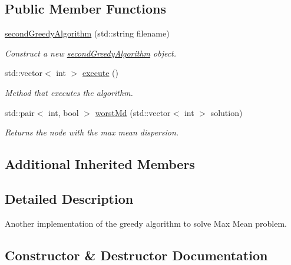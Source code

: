 \subsection*{Public Member Functions}
\begin{DoxyCompactItemize}
\item 
\hyperlink{classsecondGreedyAlgorithm_a0514ddce71b6343aaf54833c687a0fdf}{second\+Greedy\+Algorithm} (std\+::string filename)
\begin{DoxyCompactList}\small\item\em Construct a new \hyperlink{classsecondGreedyAlgorithm}{second\+Greedy\+Algorithm} object. \end{DoxyCompactList}\item 
std\+::vector$<$ int $>$ \hyperlink{classsecondGreedyAlgorithm_a119a730116003d00438179ccf4e2cafd}{execute} ()
\begin{DoxyCompactList}\small\item\em Method that executes the algorithm. \end{DoxyCompactList}\item 
std\+::pair$<$ int, bool $>$ \hyperlink{classsecondGreedyAlgorithm_a714fa858b1666fc77153890ac16f1b3f}{worst\+Md} (std\+::vector$<$ int $>$ solution)
\begin{DoxyCompactList}\small\item\em Returns the node with the max mean dispersion. \end{DoxyCompactList}\end{DoxyCompactItemize}
\subsection*{Additional Inherited Members}


\subsection{Detailed Description}
Another implementation of the greedy algorithm to solve Max Mean problem. 

\subsection{Constructor \& Destructor Documentation}
\mbox{\label{classsecondGreedyAlgorithm_a0514ddce71b6343aaf54833c687a0fdf}} 
